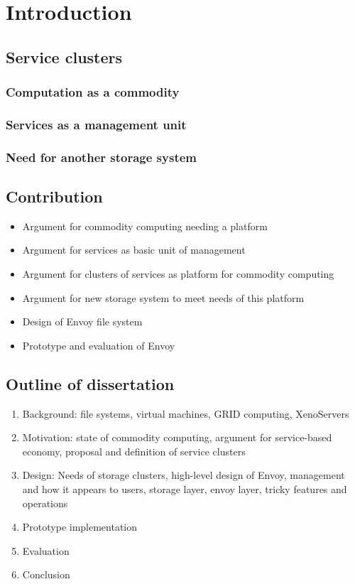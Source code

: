 \chapter{Introduction}

\section{Service clusters}

\subsection{Computation as a commodity}
\subsection{Services as a management unit}
\subsection{Need for another storage system}

\section{Contribution}
\begin{itemize}
\item Argument for commodity computing needing a platform
\item Argument for services as basic unit of management
\item Argument for clusters of services as platform for commodity computing
\item Argument for new storage system to meet needs of this platform
\item Design of Envoy file system
\item Prototype and evaluation of Envoy
\end{itemize}

\section{Outline of dissertation}
\begin{enumerate}
\item Background: file systems, virtual machines, GRID computing, XenoServers
\item Motivation: state of commodity computing, argument for service-based economy, proposal and definition of service clusters
\item Design: Needs of storage clusters, high-level design of Envoy, management and how it appears to users, storage layer, envoy layer, tricky features and operations
\item Prototype implementation
\item Evaluation
\item Conclusion
\end{enumerate}